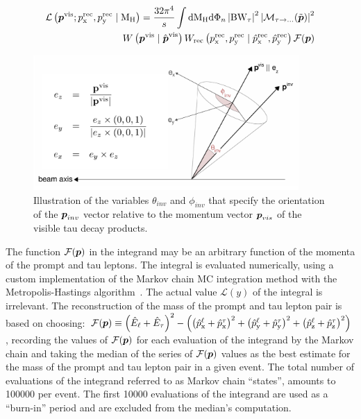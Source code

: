 \begin{equation}
  \begin{aligned}
    \mathcal{L}\left(\boldsymbol{p}^{\text{vis}} ; p_{\text{x}}^{\text{rec}}, p_{\text{y}}^{\text{rec}} \mid \text{M}_{\text{H}} \right)=\frac{32 \pi^{4}}{s} \int \text{d} \text{M}_{\text{H}} \text{d} \Phi_{n} \left|\text{BW}_{\tau}\right|^{2} \left|\mathcal{M}_{\tau \rightarrow \ldots}(\tilde{\boldsymbol{p}})\right|^{2} \\
    W\left(\boldsymbol{p}^{\text{vis}} \mid \hat{\boldsymbol{p}}^{\text{vis}}\right) W_{\text{rec}}\left(p_{\text{x}}^{\text{rec}}, p_{\text{y}}^{\text{rec}} \mid \hat{p}_{\text{x}}^{\text{rec}}, \hat{p}_{\text{y}}^{\text{rec}} \right) \mathcal{F}(\boldsymbol{p})
  \end{aligned}
\end{equation}

\begin{figure}[!htpb]
  \centering
  \includegraphics[width=0.9\textwidth]{plots/appendix/SV.png}
  \caption{Illustration of the variables $\theta_{inv}$ and $\phi_{inv}$ that specify the orientation of the $\boldsymbol{p}_{inv}$ vector relative to the momentum vector $\boldsymbol{p}_{vis}$ of the visible tau decay products.}
  \label{fig:sv}
\end{figure}

The function $\mathcal{F}(\boldsymbol{p})$ in the integrand may be an arbitrary function of the momenta of the prompt and tau leptons. The integral is evaluated numerically, using a custom implementation of the Markov chain MC integration method with the Metropolis-Hastings algorithm~\cite{Hastings:1970aa}. The actual value $\mathcal{L}(y)$ of the integral is irrelevant. The reconstruction of the mass \mlt of the prompt and tau lepton pair is based on choosing:
%
$\mathcal{F}(\boldsymbol{p}) \equiv \left(\hat{E}_{\ell} + \hat{E}_{\tau}\right)^{2} - \left(\left(\hat{p}_{\text{x}}^{\ell}+\hat{p}_{\text{x}}^{\tau}\right)^{2}+\left(\hat{p}_{\text{y}}^{\ell}+\hat{p}_{\text{y}}^{\tau}\right)^{2}+\left(\hat{p}_{\text{z}}^{\ell}+\hat{p}_{\text{z}}^{\tau}\right)^{2}\right)$,
%
recording the values of $\mathcal{F}(\boldsymbol{p})$ for each evaluation of the integrand by the Markov chain and taking the median of the series of $\mathcal{F}(\boldsymbol{p})$ values as the best estimate \mlt for the mass of the prompt and tau lepton pair in a given event. The total number of evaluations of the integrand referred to as Markov chain ``states'', amounts to 100000 per event. The first 10000 evaluations of the integrand are used as a ``burn-in'' period and are excluded from the median's computation.

